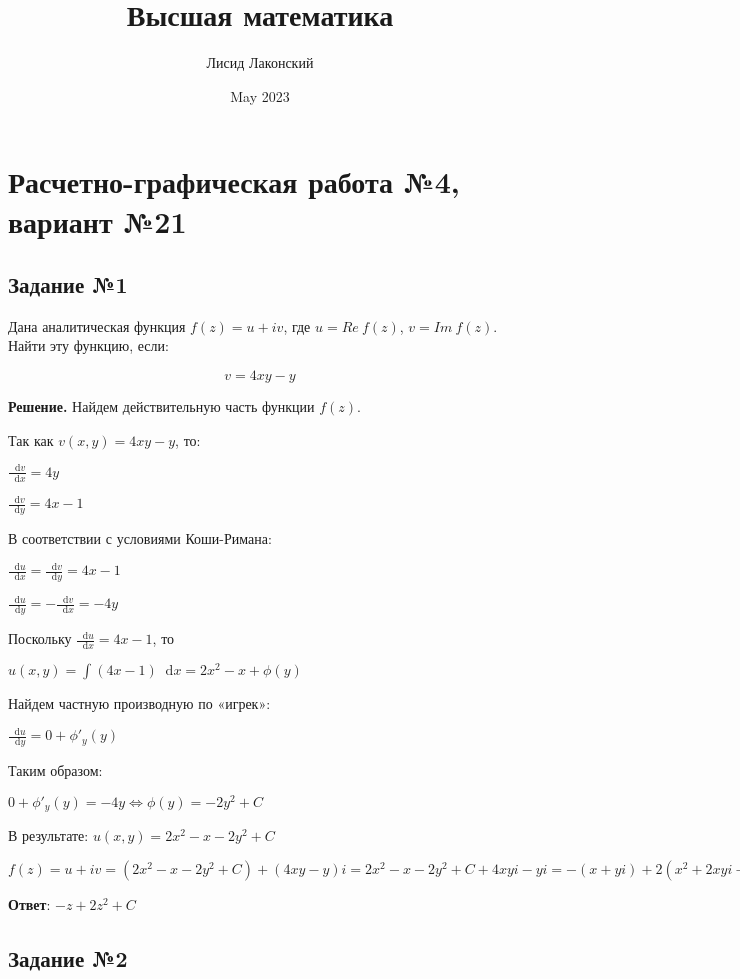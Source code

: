 \documentclass{article}
\title{Высшая математика}
\author{Лисид Лаконский}
\date{May 2023}
\newcommand*\diff{\mathop{}\!\mathrm{d}}
\begin{document}
\raggedright

\maketitle

\tableofcontents
\pagebreak

\section{Расчетно-графическая работа №4, вариант №21}

\subsection{Задание №1}

Дана аналитическая функция $f(z) = u + i v$, где $u = Re \ f(z)$, $v = Im \ f(z)$. Найти эту функцию, если:

$$
v = 4 x y - y
$$

\textbf{Решение.} Найдем действительную часть функции $f(z)$.

Так как $v(x, y) = 4 x y - y$, то:

$\frac{\diff v}{\diff x} = 4 y$

$\frac{\diff v}{\diff y} = 4 x - 1$

В соответствии с условиями Коши-Римана:

$\frac{\diff u}{\diff x} = \frac{\diff v}{\diff y} = 4 x - 1$

$\frac{\diff u}{\diff y} = -\frac{\diff v}{\diff x} = - 4 y$

Поскольку $\frac{\diff u}{\diff x} = 4 x - 1$, то

$u(x, y) = \int (4x - 1) \diff x = 2x^2 - x + \phi (y)$

Найдем частную производную по «игрек»:

$\frac{\diff u}{\diff y} = 0 + \phi'_y (y)$

Таким образом:

$0 + \phi'_y (y) = - 4 y \Longleftrightarrow \phi (y) = - 2 y^2 + C$

В результате: $u(x, y) = 2x^2 - x - 2 y^2 + C$

$f(z) = u + i v = (2x^2 - x - 2y^2 + C) + (4 x y - y) i = 2x^2 - x - 2y^2 + C + 4x y i - y i = - (x + y i) + 2 (x^2 + 2 x y i - y^2) + C = - z + 2 z^2 + C$

\hfill

\textbf{Ответ}: $-z + 2 z^2 + C$

\subsection{Задание №2}
\end{document}
